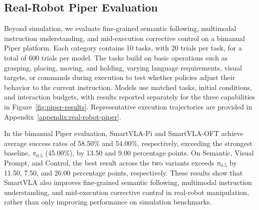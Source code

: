 \subsection{Real-Robot Piper Evaluation}\label{real-robot-piper-evaluation}

%

\begingroup
\leavevmode
Beyond simulation, we evaluate fine-grained semantic following, multimodal instruction
understanding, and mid-execution corrective control on a bimanual Piper platform.
Each category contains
10 tasks, with 20 trials per task, for a total of 600 trials per model. The
tasks build on basic operations such as grasping, placing, moving, and
holding, varying language requirements, visual targets, or commands during
execution to test whether policies adjust their behavior to the current
instruction. Models use matched tasks, initial conditions, and interaction
budgets, with results reported separately for the three capabilities in
Figure~\ref{fig:piper-results}. Representative execution
trajectories are provided in Appendix~\ref{appendix:real-robot-piper}.
\par
\endgroup

In the bimanual Piper evaluation, SmartVLA-Pi and SmartVLA-OFT achieve
average success rates of 58.50\% and 54.00\%, respectively, exceeding
the strongest baseline, $\pi_{0.5}$ (45.00\%), by 13.50 and 9.00 percentage
points. On Semantic, Visual Prompt, and Control, the best result across
the two variants exceeds $\pi_{0.5}$ by 11.50, 7.50, and 26.00 percentage
points, respectively. These results show that SmartVLA also improves
fine-grained semantic following, multimodal instruction understanding,
and mid-execution corrective control in real-robot manipulation, rather
than only improving performance on simulation benchmarks.

